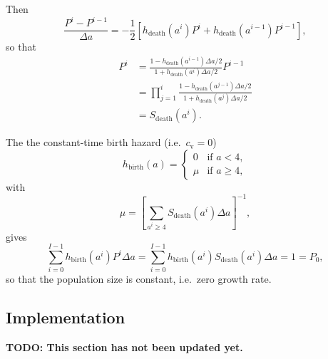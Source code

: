 \documentclass[12pt]{article}
\begin{document}
Then
\begin{equation}
  \frac{P^i - P^{i - 1}}{\Delta a}
  = - \frac{1}{2} \left[
    h_{\text{death}}(a^i) P^i
    + h_{\text{death}}(a^{i - 1}) P^{i - 1}
  \right],
\end{equation}
so that
\begin{equation}
  \label{eq:discrete_total}
  \begin{split}
    P^i
    &= \frac{
      1 - h_{\text{death}}(a^{i - 1}) \Delta a / 2
    }{
      1 + h_{\text{death}}(a^i) \Delta a / 2
    } P^{i - 1}
    \\
    &= \prod_{j = 1}^i \frac{
      1 - h_{\text{death}}(a^{j - 1}) \Delta a / 2
    }{
      1 + h_{\text{death}}(a^j) \Delta a / 2
    }
    \\
    &= S_{\text{death}}(a^i).
  \end{split}
\end{equation}

The the constant-time birth hazard
(i.e.~$c_{\mathrm{v}} = 0$)
\begin{equation}
  h_{\text{birth}}(a) =
  \begin{cases}
    0 & \text{if $a < 4$}, \\
    \mu & \text{if $a \geq 4$},
  \end{cases}
\end{equation}
with
\begin{equation}
  \mu =
  \left[
    \sum_{a^i \geq 4}
    S_{\text{death}}(a^i)
    \Delta a
  \right]^{-1},
\end{equation}
gives
\begin{equation}
  \sum_{i = 0}^{I - 1}
  h_{\text{birth}}(a^i) P^i
  \Delta a
  = \sum_{i = 0}^{I - 1}
  h_{\text{birth}}(a^i) S_{\text{death}}(a^i)
  \Delta a
  = 1 = P_0,
\end{equation}
so that the population size is constant, i.e.~zero growth rate.


\subsection{Implementation}

\textbf{TODO: This section has not been updated yet.}
\end{document}
